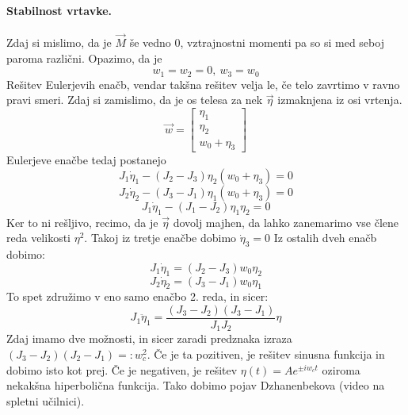 \documentclass[a4paper]{article}
\newcommand{\vct}[1]{\overrightarrow{#1}}
\begin{document}
\paragraph{Stabilnost vrtavke.} Zdaj si mislimo, da je $\vct{M}$ še vedno 0, vztrajnostni momenti pa so si med seboj paroma različni. Opazimo, da je
$$w_1=w_2=0,~w_3=w_0$$
Rešitev Eulerjevih enačb, vendar takšna rešitev velja le, če telo zavrtimo v ravno pravi smeri. Zdaj si zamislimo, da je os telesa za nek $\vct{\eta}$ izmaknjena iz osi vrtenja.
$$\vct{w} = \begin{bmatrix}
    \eta_1 \\ \eta_2 \\ w_0 + \eta_3
\end{bmatrix}$$
Eulerjeve enačbe tedaj postanejo
$$J_1\dot{\eta}_1 - (J_2 - J_3) \eta_2(w_0 + \eta_3) = 0$$
$$J_2\dot{\eta}_2 - (J_3 - J_1) \eta_1(w_0 + \eta_3) = 0$$
$$J_1\dot{\eta}_1 - (J_1 - J_2) \eta_1\eta_2 = 0$$
Ker to ni rešljivo, recimo, da je $\vct{\eta}$ dovolj majhen, da lahko zanemarimo vse člene reda velikosti $\eta^2$. Takoj iz tretje enačbe dobimo $\dot{\eta}_3 = 0$
Iz ostalih dveh enačb dobimo:
$$J_1\dot{\eta}_1 = \left(J_2 - J_3\right)w_0\eta_2$$
$$J_2\dot{\eta}_2 = \left(J_3 - J_1\right)w_0\eta_1$$
To spet združimo v eno samo enačbo 2. reda, in sicer:
$$J_1\ddot{\eta}_1 = \frac{(J_3-J_2)(J_3-J_1)}{J_1J_2}\eta$$
Zdaj imamo dve možnosti, in sicer zaradi predznaka izraza $(J_3-J_2)(J_2-J_1) =: w_c^2$. Če je ta pozitiven,
je rešitev sinusna funkcija in dobimo isto kot prej. Če je negativen, je rešitev $\eta(t) = Ae^{\pm iw_ct}$
oziroma nekakšna hiperbolična funkcija. Tako dobimo pojav Dzhanenbekova (video na spletni učilnici).
\end{document}

